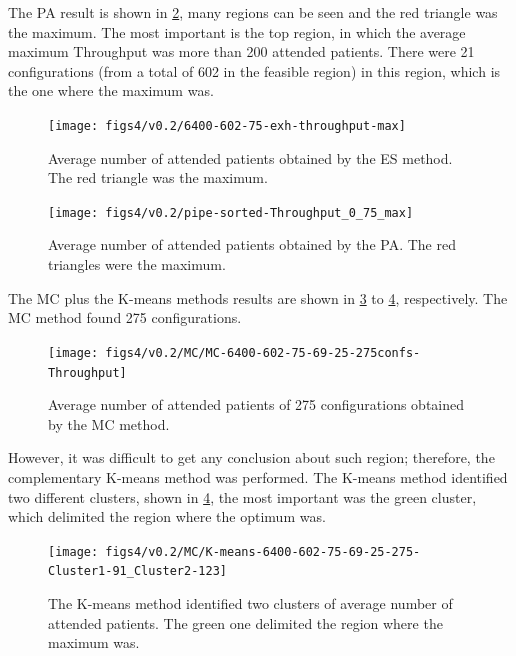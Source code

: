 The PA result is shown in \ref{subfig:pipe12-2}, many regions can
be seen and the red triangle was the maximum. The most important is
the top region, in which the average maximum Throughput was more than
200 attended patients. There were 21 configurations (from a total
of 602 in the feasible region) in this region, which is the one where
the maximum was.

\begin{figure}[H]
\centering{}\texttt{[image: figs4/v0.2/6400-602-75-exh-throughput-max]}\caption{Average number of attended patients obtained by the ES method. The
red triangle was the maximum. \label{subfig:es12-2}}
\end{figure}
 
\begin{figure}[H]
\centering{}\texttt{[image: figs4/v0.2/pipe-sorted-Throughput\_0\_75\_max]}\caption{Average number of attended patients obtained by the PA. The red triangles
were the maximum.\label{subfig:pipe12-2}}
\end{figure}


The MC plus the K-means methods results are shown in \ref{subfig:mc12-2}
to \ref{subfig:km12-2}, respectively. The MC method found 275 configurations.
\begin{figure}[H]
\centering{}\texttt{[image: figs4/v0.2/MC/MC-6400-602-75-69-25-275confs-Throughput]}\caption{Average number of attended patients of 275 configurations obtained
by the MC method. \label{subfig:mc12-2}}
\end{figure}
 However, it was difficult to get any conclusion about such region;
therefore, the complementary K-means method was performed. The K-means
method identified two different clusters, shown in \ref{subfig:km12-2},
the most important was the green cluster, which delimited the region
where the optimum was.
\begin{figure}[H]
\begin{centering}
\texttt{[image: figs4/v0.2/MC/K-means-6400-602-75-69-25-275-Cluster1-91\_Cluster2-123]}
\par\end{centering}

\caption{The K-means method identified two clusters of average number of attended
patients. The green one delimited the region where the maximum was.\label{subfig:km12-2}}
\end{figure}

